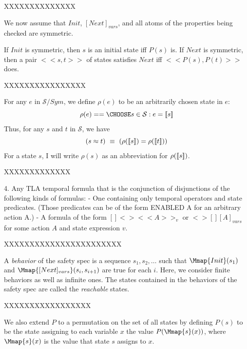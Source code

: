 \documentclass[fleqn,leqno]{article}
\newcommand{\sym}{\ensuremath{Sym}}
\newcommand{\ec}[1]{\mbox{\ensuremath{[\![#1]\!]}}}
\newcommand{\states}{\ensuremath{\mathcal{S}}}
\newcommand{\smod}{\ensuremath{\states/\sym}}
\newcommand{\rep}[1]{\ensuremath{\rho(#1)}}
\newcommand{\cng}{\approx}
\begin{document}
XXXXXXXXXXXXXX



We now assume that $Init$, $[Next]_{vars}$, and all atoms of the
properties being checked are symmetric.



If $Init$ is
symmetric, then $s$ is an initial state iff $P(s)$ is.  If $Next$ is
symmetric, then a pair $<<s, t>>$ of states satisfies $Next$ iff
$<<P(s), P(t)>>$ does.


XXXXXXXXXXXXXXXX



For any $e$ in \smod, we 
define \rep{e} to be an arbitrarily chosen state in $e$:
  \[ \rep{e} == \CHOOSE s \in \states : e = \ec{s}
  \]
Thus, for any $s$ and $t$ in \states, we have
  \[ (s\cng t) \ \equiv\ (\rep{\ec{s}} = \rep{\ec{t}})
  \]
For a state $s$, I will write \rep{s} as an abbreviation for
\rep{\ec{s}}.


XXXXXXXXXXXXX

   4. Any TLA temporal formula that is the conjunction of disjunctions
      of the following kinds of formulas:
     - One containing only temporal operators and state predicates.  
      (Those predicates can be of the form ENABLED A for an arbitrary 
      action A.)
     - A formula of the form $[]<><<A>>_{v}$  or $<>[][A]_{vars}$ for some 
       action $A$ and state expression $v$.

XXXXXXXXXXXXXXXXXXXXXXX

A \emph{behavior} of the safety spec is a sequence $s_{1}, s_{2},
\ldots$ such that
$\Mmap{Init}(s_{1})$ and $\Mmap{[Next]_{vars}}(s_{i}, s_{i+1})$ are
true for each $i$.  Here, we consider finite behaviors as well as
infinite ones.  The states contained in the behaviors of the safety
spec are called the \emph{reachable} states.


XXXXXXXXXXXXXXXXX

We also extend $P$ to a permutation on the set of all states by
defining $P(s)$ to be the state assigning to each variable $x$ the
value $P(\Mmap{s}(x))$, where $\Mmap{s}(x)$ is the value that state $s$
assigns to $x$.  
\end{document}
